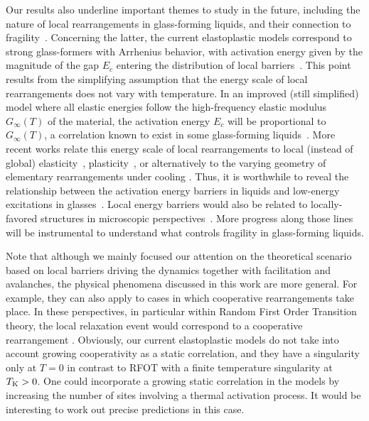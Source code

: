\documentclass[pre,twocolumn,superscriptaddress,tightenlines,showpacs,longbibliography,floatfix,footinbib]{revtex4-1}
\begin{document}
Our results also underline important themes to study in the future, including the nature of local rearrangements in glass-forming liquids, and their connection to fragility~\cite{ediger1996supercooled}. Concerning the latter, the current elastoplastic models correspond to strong glass-formers with Arrhenius behavior, with activation energy given by the magnitude of the gap $E_c$ entering the distribution of local barriers~\cite{popovic2021thermally,ozawa2023elasticity}. This point results from the simplifying assumption that the energy scale of local rearrangements does not vary with temperature. In an improved (still simplified) model where all elastic energies follow the high-frequency elastic modulus $G_{\infty}(T)$ of the material, the activation energy $E_c$ will be proportional to $G_{\infty}(T)$, a correlation known to exist in some glass-forming liquids~\cite{dyre2006colloquium,hecksher2015review}. More recent works relate this energy scale of local rearrangements to local (instead of global) elasticity~\cite{JeppeEdan}, plasticity~\cite{lerbinger2022relevance}, or alternatively to the varying geometry of elementary rearrangements under cooling \cite{Wencheng22}. 
Thus, it is worthwhile to reveal the relationship between the activation energy barriers in liquids and low-energy excitations in glasses~\cite{scalliet2019nature,mizuno2020intermittent,richard2023detecting}.
Local energy barriers would also be related to locally-favored structures in microscopic perspectives~\cite{coslovich2007understanding,royall2015role}.
More progress along those lines will be instrumental to understand what controls fragility in glass-forming liquids.

Note that although we mainly focused our attention on the theoretical scenario based on local barriers driving the dynamics \cite{JeppeEdan,lerbinger2022relevance,massimo} together with facilitation and avalanches, the physical phenomena discussed in this work are more general. For example, they can also apply to cases in which cooperative rearrangements take place.  In these perspectives, in particular within Random First Order Transition theory, the local relaxation event would correspond to a cooperative rearrangement \cite{scalliet2022thirty,biroli2022rfot}. Obviously, our current elastoplastic models do not take into account growing cooperativity as a static correlation, and they have a singularity only at $T=0$ in contrast to RFOT with a finite temperature singularity at $T_{\rm K}>0$. One could incorporate a growing static correlation in the models by increasing the number of sites involving a thermal activation process. It would be interesting to work out precise predictions in this case.  
\end{document}
